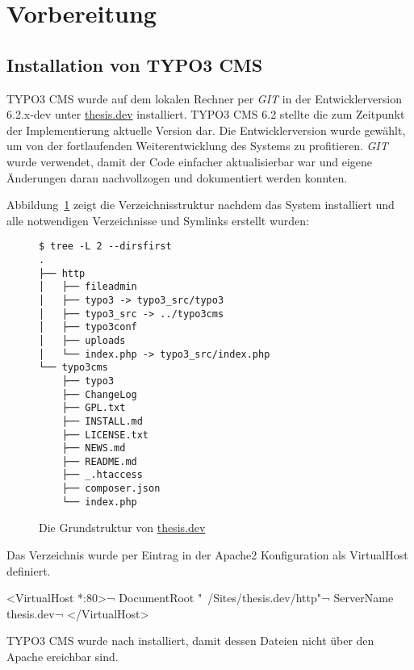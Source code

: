\section{Vorbereitung}
\label{prototype:sec:preparation}

\subsection{Installation von TYPO3 CMS}
\label{prototype:subsec:installTYPO3}
TYPO3 CMS wurde auf dem lokalen Rechner per \textit{GIT} in der Entwicklerversion 6.2.x-dev unter \url{thesis.dev} installiert. TYPO3 CMS 6.2 stellte die zum Zeitpunkt der Implementierung aktuelle Version dar. Die Entwicklerversion wurde gewählt, um von der fortlaufenden Weiterentwicklung des Systems zu profitieren. \textit{GIT} wurde verwendet, damit der Code einfacher aktualisierbar war und eigene Änderungen daran nachvollzogen und dokumentiert werden konnten.

Abbildung~\ref{lst:thesisDevFolders} zeigt die Verzeichnisstruktur nachdem das System installiert und alle notwendigen Verzeichnisse und Symlinks erstellt wurden:

\begin{figure}[H]
\begin{Verbatim}[samepage=true]
$ tree -L 2 --dirsfirst
.
├── http
│   ├── fileadmin
│   ├── typo3 -> typo3_src/typo3
│   ├── typo3_src -> ../typo3cms
│   ├── typo3conf
│   ├── uploads
│   └── index.php -> typo3_src/index.php
└── typo3cms
    ├── typo3
    ├── ChangeLog
    ├── GPL.txt
    ├── INSTALL.md
    ├── LICENSE.txt
    ├── NEWS.md
    ├── README.md
    ├── _.htaccess
    ├── composer.json
    └── index.php
\end{Verbatim}
\caption{Die Grundstruktur von \url{thesis.dev}}
\label{lst:thesisDevFolders}
\end{figure}

Das Verzeichnis  wurde per Eintrag in der Apache2 Konfiguration als VirtualHost definiert.

\begin{shcode}
<VirtualHost *:80>¬
DocumentRoot "~/Sites/thesis.dev/http"¬
ServerName thesis.dev¬
</VirtualHost>
\end{shcode}

TYPO3 CMS wurde nach  installiert, damit dessen Dateien nicht über den Apache ereichbar sind.

